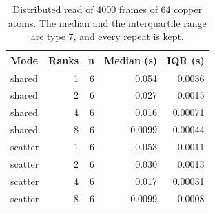\begin{table}[tbp]
\centering
\footnotesize
\caption{Distributed read of 4000 frames of 64 copper atoms. The median and the interquartile range are type 7, and every repeat is kept.}
\label{tab:mpi-host}
\begin{tabular}{@{}lrrrr@{}}
\toprule
Mode & Ranks & n & Median (s) & IQR (s) \\
\midrule
shared & 1 & 6 & 0.054 & 0.0036 \\
shared & 2 & 6 & 0.027 & 0.0015 \\
shared & 4 & 6 & 0.016 & 0.00071 \\
shared & 8 & 6 & 0.0099 & 0.00044 \\
scatter & 1 & 6 & 0.053 & 0.0011 \\
scatter & 2 & 6 & 0.030 & 0.0013 \\
scatter & 4 & 6 & 0.017 & 0.00031 \\
scatter & 8 & 6 & 0.0099 & 0.0008 \\
\bottomrule
\end{tabular}
\end{table}

